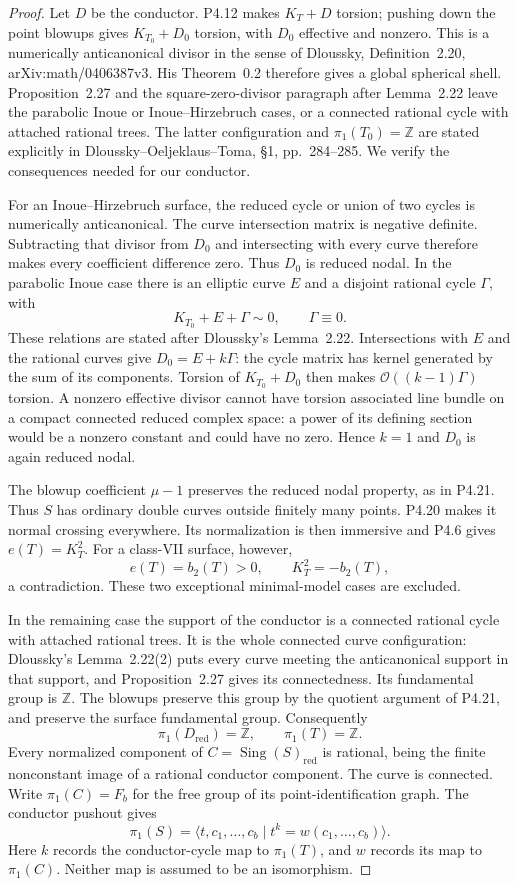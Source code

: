\begin{proof}
Let $D$ be the conductor. P4.12 makes $K_T+D$ torsion;
pushing down the point blowups gives $K_{T_0}+D_0$ torsion,
with $D_0$ effective and nonzero. This is a numerically
anticanonical divisor in the sense of Dloussky,
Definition~2.20, arXiv:math/0406387v3. His Theorem~0.2
therefore gives a global spherical shell. Proposition~2.27
and the square-zero-divisor paragraph after Lemma~2.22
leave the parabolic Inoue or Inoue--Hirzebruch cases,
or a connected rational cycle with attached rational
trees. The latter configuration and $\pi_1(T_0)=\mathbb Z$
are stated explicitly in Dloussky--Oeljeklaus--Toma,
\S1, pp.~284--285. We verify the consequences needed
for our conductor.

For an Inoue--Hirzebruch surface, the reduced cycle or
union of two cycles is numerically anticanonical. The
curve intersection matrix is negative definite. Subtracting
that divisor from $D_0$ and intersecting with every curve
therefore makes every coefficient difference zero.
Thus $D_0$ is reduced nodal. In the parabolic Inoue case
there is an elliptic curve $E$ and a disjoint rational
cycle $\Gamma$, with
\[
 K_{T_0}+E+\Gamma\sim0,\qquad \Gamma\equiv0.
\]
These relations are stated after Dloussky's Lemma~2.22.
Intersections with $E$ and the rational curves give
$D_0=E+k\Gamma$: the cycle matrix has kernel generated
by the sum of its components. Torsion of $K_{T_0}+D_0$
then makes $\mathcal O((k-1)\Gamma)$ torsion. A nonzero
effective divisor cannot have torsion associated line
bundle on a compact connected reduced complex space:
a power of its defining section would be a nonzero
constant and could have no zero. Hence $k=1$ and
$D_0$ is again reduced nodal.

The blowup coefficient $\mu-1$ preserves the reduced
nodal property, as in P4.21. Thus $S$ has ordinary
double curves outside finitely many points. P4.20
makes it normal crossing everywhere. Its normalization
is then immersive and P4.6 gives $e(T)=K_T^2$.
For a class-VII surface, however,
\[
 e(T)=b_2(T)>0,\qquad K_T^2=-b_2(T),
\]
a contradiction. These two exceptional minimal-model
cases are excluded.

In the remaining case the support of the conductor is
a connected rational cycle with attached rational trees.
It is the whole connected curve configuration: Dloussky's
Lemma~2.22(2) puts every curve meeting the anticanonical
support in that support, and Proposition~2.27 gives its
connectedness. Its fundamental group is $\mathbb Z$.
The blowups preserve this group by the quotient argument
of P4.21, and preserve the surface fundamental group.
Consequently
\[
 \pi_1(D_{\mathrm{red}})=\mathbb Z,\qquad
 \pi_1(T)=\mathbb Z.
\]
Every normalized component of
$C=\operatorname{Sing}(S)_{\mathrm{red}}$ is rational,
being the finite nonconstant image of a rational conductor
component. The curve is connected. Write $\pi_1(C)=F_b$
for the free group of its point-identification graph.
The conductor pushout gives
\[
 \pi_1(S)=
 \langle t,c_1,\ldots,c_b\mid t^k=w(c_1,\ldots,c_b)\rangle.
\]
Here $k$ records the conductor-cycle map to $\pi_1(T)$,
and $w$ records its map to $\pi_1(C)$. Neither map is
assumed to be an isomorphism.


\end{proof}
